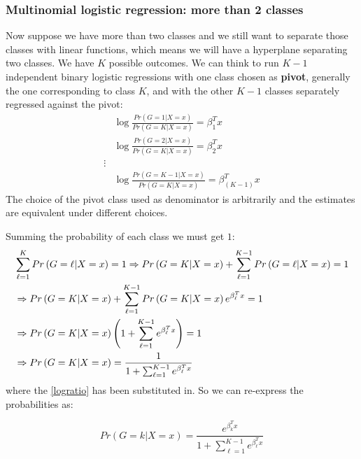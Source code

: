 \subsubsection{Multinomial logistic regression: more than 2 classes}
Now suppose we have more than two classes and we still want to separate those classes with linear functions, which means we will have a hyperplane separating two classes. We have $K$ possible outcomes. We can think to run $K-1$ independent binary logistic regressions with one class chosen as \textbf{pivot}, generally the one corresponding to class $K$, and with the other $K-1$ classes separately regressed against the pivot:
\begin{equation}
\begin{aligned}
&\log \frac{Pr\left(G=1|X=x\right)}{Pr\left(G=K|X=x\right)} = \beta_1^T x \\
&\log \frac{Pr\left(G=2|X=x\right)}{Pr\left(G=K|X=x\right)} = \beta_2^T x\\
\vdots\\
&\log \frac{Pr\left(G=K-1|X=x\right)}{Pr\left(G=K|X=x\right)} = \beta_{\left(K-1\right)}^T x
\end{aligned}
\label{logratio}
\end{equation}
The choice of the pivot class used as denominator is arbitrarily and the estimates are equivalent under different choices.

Summing the probability of each class we must get $1$:
\begin{equation}
\begin{aligned}
&\sum_{\ell=1}^{K} Pr\left(G=\ell|X=x\right) = 1 \Rightarrow Pr\left(G=K|X=x\right)+ \sum_{\ell=1}^{K-1} Pr\left(G=\ell|X=x\right)=1\\
&\Rightarrow Pr\left(G=K|X=x\right) +\sum_{\ell=1}^{K-1} Pr\left(G=K|X=x\right)e^{\beta_\ell^Tx}=1\\
&\Rightarrow Pr\left(G=K|X=x\right) \left(1+\sum_{\ell=1}^{K-1} e^{\beta_\ell^Tx}\right)=1\\
&\Rightarrow Pr\left(G=K|X=x\right)= \frac{1}{1+\sum_{\ell=1}^{K-1} e^{\beta_\ell^Tx}}
\end{aligned}
\end{equation}
where the \autoref{logratio} has been substituted in.
So we can re-express the probabilities as:

\begin{equation}
Pr\left(G=k|X=x\right) = \frac{e^{\beta_{k}^T x}}{1+\sum_{\ell=1}^{K-1} e^{\beta_\ell^Tx}}
\end{equation}

